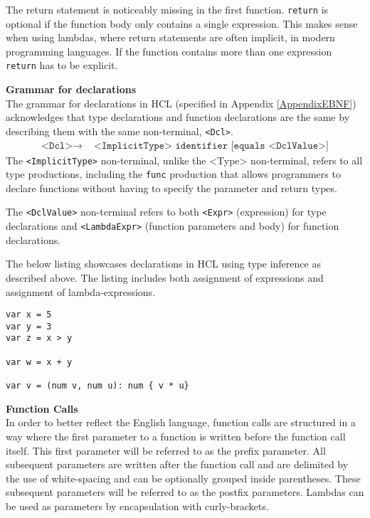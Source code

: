 The return statement is noticeably missing in the first function.
\texttt{return} is optional if the function body only contains a single expression. 
This makes sense when using lambdas, where return statements are often implicit, in modern programming languages. 
If the function contains more than one expression \texttt{return} has to be explicit.

\textbf{Grammar for declarations}\\
The grammar for declarations in HCL (specified in Appendix \ref{AppendixEBNF}) acknowledges that type declarations and function declarations are the same by describing them with the same non-terminal, \texttt{<Dcl>}.
\begin{align*}
	\texttt{<Dcl>}\to & \texttt{ <ImplicitType> identifier [equals <DclValue>]}
\end{align*}
The \texttt{<ImplicitType>} non-terminal, unlike the <Type> non-terminal, refers to all type productions, including the \texttt{func} production that allows programmers to declare functions without having to specify the parameter and return types.

The \texttt{<DclValue>} non-terminal refers to both \texttt{<Expr>} (expression) for type declarations and \texttt{<LambdaExpr>} (function parameters and body) for function declarations.

The below listing showcases declarations in HCL using type inference as described above.
The listing includes both assignment of expressions and assignment of lambda-expressions.

\begin{lstlisting}[language=HCL,caption={Implicit type declarations in HCL.
},firstnumber=1]
var x = 5
var y = 3
var z = x > y

var w = x + y

var v = (num v, num u): num { v * u}
\end{lstlisting}

\textbf{Function Calls}\\
In order to better reflect the English language, function calls are structured in a way where the first parameter to a function is written before the function call itself.
This first parameter will be referred to as the prefix parameter. 
All subsequent parameters are written after the function call and are delimited by the use of white-spacing and can be optionally grouped inside parentheses.
These subsequent parameters will be referred to as the postfix parameters.
Lambdas can be used as parameters by encapsulation with curly-brackets. 

